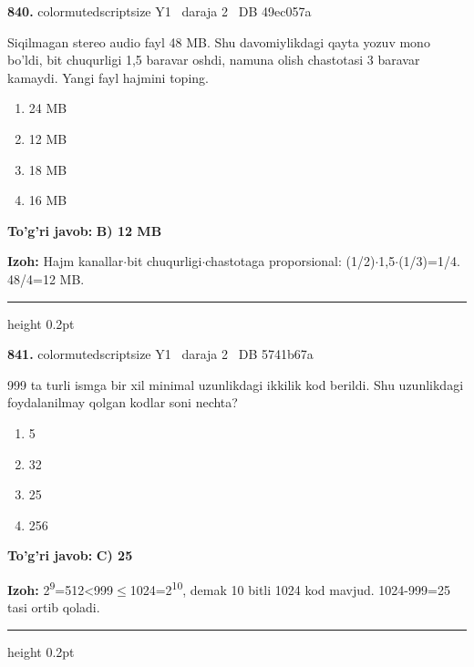 \documentclass[10pt,a4paper,oneside]{article}
\begin{document}
\noindent\textbf{\color{ink}840.}  {color{muted}scriptsize Y1 \textbullet\ daraja 2 \textbullet\ DB 49ec057a}
\par
Siqilmagan stereo audio fayl 48 MB. Shu davomiylikdagi qayta yozuv mono bo'ldi, bit chuqurligi 1,5 baravar oshdi, namuna olish chastotasi 3 baravar kamaydi. Yangi fayl hajmini toping.
\begin{enumerate}[label=\Alph*),leftmargin=9mm]
\item 24 MB
\item 12 MB
\item 18 MB
\item 16 MB
\end{enumerate}
\begin{tcolorbox}[enhanced,breakable,colback=teal!4,colframe=teal!50!black,boxrule=0.5pt,arc=1.1mm,left=3mm,right=3mm,top=1.7mm,bottom=1.7mm,before skip=2mm,after skip=2mm]
\textbf{\color{teal}To'g'ri javob:} \textbf{B) 12 MB}
\par\smallskip
\textbf{Izoh:} Hajm kanallar\ensuremath{\cdot}bit chuqurligi\ensuremath{\cdot}chastotaga proporsional: (1/2)\ensuremath{\cdot}1,5\ensuremath{\cdot}(1/3)=1/4. 48/4=12 MB.
\end{tcolorbox}
\vspace{2mm}\hrule height 0.2pt \vspace{3mm}

\noindent\textbf{\color{ink}841.}  {color{muted}scriptsize Y1 \textbullet\ daraja 2 \textbullet\ DB 5741b67a}
\par
999 ta turli ismga bir xil minimal uzunlikdagi ikkilik kod berildi. Shu uzunlikdagi foydalanilmay qolgan kodlar soni nechta?
\begin{enumerate}[label=\Alph*),leftmargin=9mm]
\item 5
\item 32
\item 25
\item 256
\end{enumerate}
\begin{tcolorbox}[enhanced,breakable,colback=teal!4,colframe=teal!50!black,boxrule=0.5pt,arc=1.1mm,left=3mm,right=3mm,top=1.7mm,bottom=1.7mm,before skip=2mm,after skip=2mm]
\textbf{\color{teal}To'g'ri javob:} \textbf{C) 25}
\par\smallskip
\textbf{Izoh:} 2\textsuperscript{9}=512\textless{}999\ensuremath{\leq}1024=2\textsuperscript{1}\textsuperscript{0}, demak 10 bitli 1024 kod mavjud. 1024-999=25 tasi ortib qoladi.
\end{tcolorbox}
\vspace{2mm}\hrule height 0.2pt \vspace{3mm}
\end{document}
